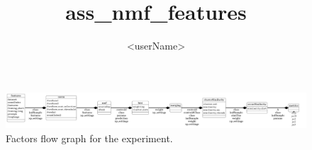 \documentclass[12pt,a4paper,fleqn]{tufte-handout}
\title{ass\_nmf\_features}
\author{ <userName> }
\begin{document}
                                   
 
\maketitle                                   
 
 
 
 
 
 
 
\begin{center}                                 
 
 
\begin{figure}                                
 
 
\includegraphics[width=\textwidth,height=0.8\textheight,keepaspectratio]{../figures/factors.pdf}                               
 
 
\label{factorFlowGraph}                              
 
 
\caption{Factors flow graph for the experiment.}                             
 
 
\end{figure}                            
 
 
\end{center}                           
 
\end{document}
